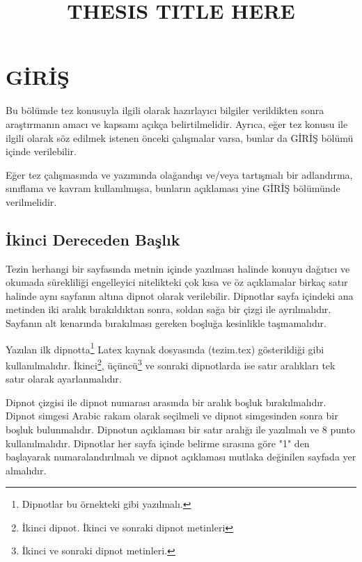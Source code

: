 \documentclass[tekyonlu,turkce,yukseklisans,karton,fenbilimleri]{tnkutez}
\title{THESIS TITLE HERE}{SECOND LINE IF NECESSARY}{THIRD LINE IF NECESSARY, FIT TITLE IN THREE LINES}
\begin{document}
%
%
%
%
%




\chapter{GİRİŞ}
\hspace{1.25cm}Bu bölümde tez konusuyla ilgili olarak hazırlayıcı bilgiler verildikten sonra araştırmanın amacı ve kapsamı açıkça belirtilmelidir. Ayrıca, eğer tez konusu ile ilgili olarak söz edilmek istenen önceki çalışmalar varsa, bunlar da GİRİŞ bölümü içinde verilebilir. 

Eğer tez çalışmasında ve yazımında olağandışı ve/veya tartışmalı bir adlandırma, sınıflama ve kavram kullanılmışsa, bunların açıklaması yine GİRİŞ bölümünde verilmelidir. 

\section{İkinci Dereceden Başlık}
Tezin herhangi bir sayfasında metnin içinde yazılması halinde konuyu dağıtıcı ve okumada sürekliliği engelleyici nitelikteki çok kısa ve öz açıklamalar birkaç satır halinde aynı sayfanın altına dipnot olarak verilebilir. Dipnotlar sayfa içindeki ana metinden iki aralık bırakıldıktan sonra, soldan sağa bir çizgi ile ayrılmalıdır. Sayfanın alt kenarında bırakılması gereken boşluğa kesinlikle taşmamalıdır.

Yazılan ilk dipnotta\footnote{Dipnotlar bu örnekteki gibi yazılmalı.}   Latex kaynak dosyasında (tezim.tex) gösterildiği gibi kullanılmalıdır. İkinci\footnote{İkinci dipnot. İkinci ve sonraki dipnot metinleri}, üçüncü\footnote{İkinci ve sonraki dipnot metinleri.} ve sonraki dipnotlarda ise satır aralıkları tek satır olarak ayarlanmalıdır. 

Dipnot çizgisi ile dipnot numarası arasında bir aralık boşluk bırakılmalıdır. Dipnot simgesi Arabic rakam olarak seçilmeli ve dipnot simgesinden sonra bir boşluk bulunmalıdır. Dipnotun açıklaması bir satır aralığı ile yazılmalı ve 8 punto kullanılmalıdır. Dipnotlar her sayfa içinde belirme sırasına göre "1" den başlayarak numaralandırılmalı ve dipnot açıklaması mutlaka değinilen sayfada yer almalıdır. 
\end{document}
